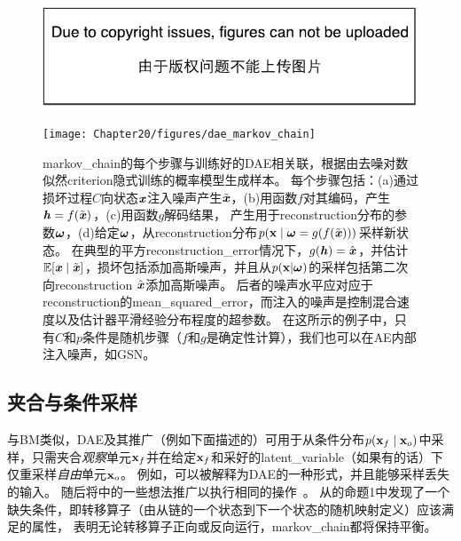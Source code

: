 \begin{figure}[!htb]
\ifOpenSource
\centerline{\includegraphics{figure.pdf}}
\else
\centerline{\texttt{[image: Chapter20/figures/dae\_markov\_chain]}}
\fi
\caption{\gls{markov_chain}的每个步骤与训练好的\gls{DAE}相关联，根据由去噪对数似然\gls{criterion}隐式训练的概率模型生成样本。
每个步骤包括：(a)通过损坏过程$C$向状态$\boldsymbol{\mathit{x}}$注入噪声产生$\tilde{\boldsymbol{\mathit{x}}}$，(b)用函数$f$对其编码，产生$\boldsymbol{\mathit{h}} = f(\tilde{\boldsymbol{\mathit{x}}})$，(c)用函数$g$解码结果， 产生用于\gls{reconstruction}分布的参数$\boldsymbol{\omega}$，(d)给定$\boldsymbol{\omega}$，从\gls{reconstruction}分布$p(\mathbf{x} \mid \boldsymbol{\omega} = g(f(\tilde{\boldsymbol{\mathit{x}}})))$采样新状态。
在典型的平方\gls{reconstruction_error}情况下，$g(\boldsymbol{\mathit{h}}) = \hat{\boldsymbol{\mathit{x}}}$，并估计$\mathbb{E} [ \boldsymbol{\mathit{x}} \mid \tilde{\boldsymbol{\mathit{x}}}]$，损坏包括添加高斯噪声，并且从$p(\mathbf{x} | \boldsymbol{\omega})$的采样包括第二次向\gls{reconstruction} $\hat{\boldsymbol{\mathit{x}}}$添加高斯噪声。
后者的噪声水平应对应于\gls{reconstruction}的\gls{mean_squared_error}，而注入的噪声是控制混合速度以及估计器平滑经验分布程度的超参数\citep{Vincent-NC-2011-small}。
在这所示的例子中，只有$C$和$p$条件是随机步骤（$f$和$g$是确定性计算），我们也可以在\gls{AE}内部注入噪声，如\gls{GSN}\citep{Bengio-et-al-ICML-2014}。
}
\label{fig:chap20_dae_markov_chain}
\end{figure}


\subsection{夹合与条件采样}
\label{sec:clamping_and_conditional_sampling}

与\gls{BM}类似，\gls{DAE}及其推广（例如下面描述的）可用于从条件分布$p(\mathbf{x}_f  \mid  \mathbf{x}_o)$中采样，只需夹合\emph{观察}单元$\mathbf{x}_f$并在给定$\mathbf{x}_f$和采好的\gls{latent_variable}（如果有的话）下仅重采样\emph{自由}单元$\mathbf{x}_o$。
例如，可以被解释为\gls{DAE}的一种形式，并且能够采样丢失的输入。
随后将中的一些想法推广以执行相同的操作~\citep{Bengio-et-al-ICML-2014}。
\citet{Alain-et-al-arxiv2015} 从\citet{Bengio-et-al-ICML-2014}的命题1中发现了一个缺失条件，即转移算子（由从链的一个状态到下一个状态的随机映射定义）应该满足的属性， 表明无论转移算子正向或反向运行，\gls{markov_chain}都将保持平衡。

